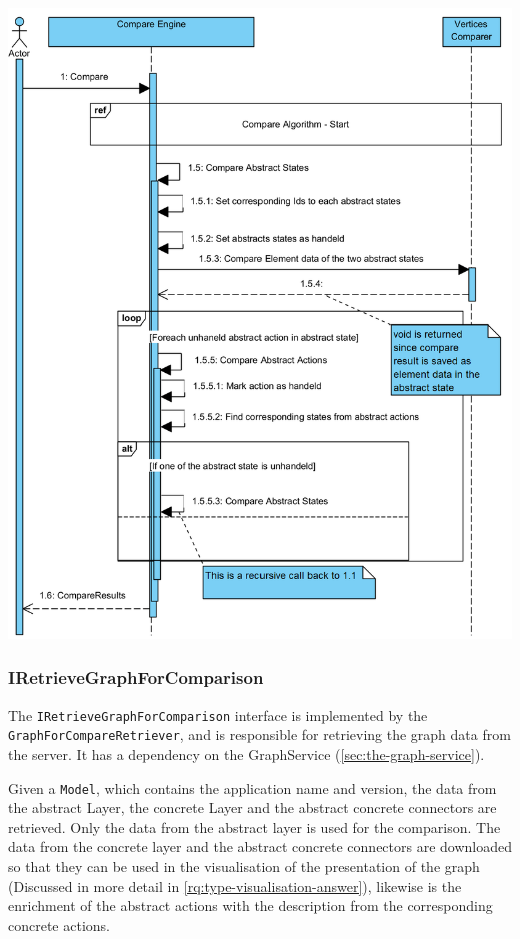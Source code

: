 \begingroup
\captionsetup{type=figure}
\includegraphics[scale=0.9]{content/5-Results/Images/Compare-algorithm-compare.png}
\label{fig:compare-algorithm-compare}
\endgroup

\subsubsection{IRetrieveGraphForComparison}
The \verb|IRetrieveGraphForComparison| interface is implemented by the \verb|GraphForCompareRetriever|, and is responsible for retrieving the graph data from the server. It has a dependency on the GraphService (\ref{sec:the-graph-service}). 

Given a \verb|Model|, which contains the application name and version, the data from the abstract Layer, the concrete Layer and the abstract concrete connectors are retrieved. Only the data from the abstract layer is used for the comparison. The data from the concrete layer and the abstract concrete connectors are downloaded so that they can be used in the visualisation of the presentation of the graph (Discussed in more detail in \ref{rq:type-visualisation-answer}), likewise is the enrichment of the abstract actions with the description from the corresponding concrete actions.

